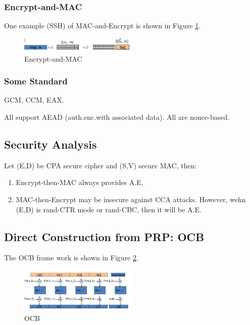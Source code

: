 \subsubsection{Encrypt-and-MAC}

One example (SSH) of MAC-and-Encrypt  is shown in Figure \ref{fig: 05 Encrypt-and-MAC}.


\begin{figure}[h]
    \centering
    \includegraphics[width=0.5\textwidth]{Stanford_Crypto_1/fig/05_Authentication/E and M.png}
    \caption{Encrypt-and-MAC}
    \label{fig: 05 Encrypt-and-MAC}
\end{figure}


\subsubsection{Some Standard}

GCM, CCM, EAX.

All support AEAD (auth.enc.with associated data). All are nonce-based.

\subsection{Security Analysis}

Let (E,D) be CPA secure cipher and (S,V) secure MAC, then:

\begin{enumerate}
    \item Encrypt-then-MAC always provides A.E.
    \item MAC-then-Encrypt may be insecure against CCA attacks. However, wehn (E,D) is rand-CTR mode or rand-CBC, then it will be A.E.
\end{enumerate}

\subsection{Direct Construction from PRP: OCB}

The OCB frame work is shown in Figure \ref{fig: 05 OCB}.


\begin{figure}[h]
    \centering
    \includegraphics[width=0.5\textwidth]{Stanford_Crypto_1/fig/05_Authentication/OCB.png}
    \caption{OCB}
    \label{fig: 05 OCB}
\end{figure}


